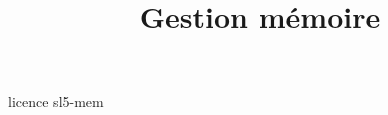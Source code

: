 \documentclass [xcolor=table] {beamer}
\title {Gestion mémoire}
\begin{document}
 {licence}
 {sl5-mem}
\end{document}
